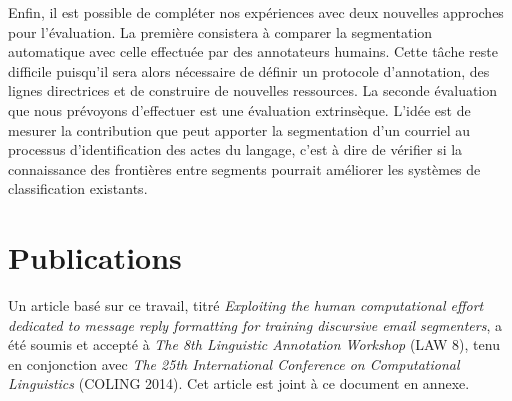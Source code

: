 Enfin, il est possible de compléter nos expériences avec deux nouvelles approches pour l'évaluation. La première consistera à comparer la segmentation automatique avec celle effectuée par des annotateurs humains. Cette tâche reste difficile puisqu'il sera alors nécessaire de définir un protocole d'annotation, des lignes directrices et de construire de nouvelles ressources. La seconde évaluation que nous prévoyons d'effectuer est une évaluation extrinsèque. L'idée est de mesurer la contribution que peut apporter la segmentation d'un courriel au processus d'identification des actes du langage, c'est à dire de vérifier si la connaissance des frontières entre segments pourrait améliorer les systèmes de classification existants.

\section{Publications}

Un article basé sur ce travail, titré \textit{Exploiting the human computational effort dedicated to message reply formatting for training discursive email segmenters}, a été soumis et accepté à \textit{The 8th Linguistic Annotation Workshop} (LAW 8), tenu en conjonction avec \textit{The 25th International Conference on Computational Linguistics} (COLING 2014). Cet article est joint à ce document en annexe.